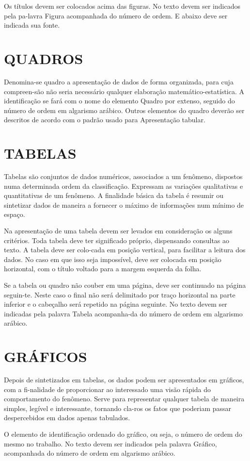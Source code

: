 Os títulos devem ser colocados acima das figuras. No texto devem
ser indicados pela pa-lavra Figura acompanhada do número de ordem. E abaixo deve ser indicada sua fonte.

\section{QUADROS}

Denomina-se quadro a apresentação de dados de forma organizada, para cuja compreen-são não seria necessário qualquer elaboração matemático-estatística. A identificação se fará com o nome do elemento Quadro por extenso, seguido do número de ordem em algarismo arábico. Outros elementos do quadro deverão ser descritos de acordo com o padrão usado para
Apresentação tabular.



\section{TABELAS}

Tabelas são conjuntos de dados numéricos, associados a um
fenômeno, dispostos numa determinada ordem da classificação. Expressam as variações qualitativas e quantitativas de um fenômeno. A finalidade básica da tabela é resumir ou sintetizar dados de maneira a fornecer o máximo de informações num mínimo de espaço.

Na apresentação de uma tabela devem ser levados em consideração
os alguns critérios. Toda tabela deve ter significado próprio, dispensando consultas ao texto. A tabela deve ser colo-cada em posição vertical, para facilitar a leitura dos dados. No caso em que isso seja impossível, deve ser colocada em posição horizontal, com o título voltado para a margem esquerda da folha.

Se a tabela ou quadro não couber em uma página, deve ser
continuado na página seguin-te. Neste caso o final não será delimitado por traço horizontal na parte inferior e o cabeçalho será repetido na página seguinte. No texto devem ser indicadas pela palavra Tabela acompanha-da do número de ordem em algarismo arábico.



\section{GRÁFICOS}

Depois de sintetizados em tabelas, os dados podem ser
apresentados em gráficos, com a fi-nalidade de proporcionar ao interessado uma visão rápida do comportamento do fenômeno. Serve para representar qualquer tabela de maneira simples, legível e interessante, tornando cla-ros os fatos que poderiam passar despercebidos em dados apenas tabulados.

O elemento de identificação ordenado do gráfico, ou seja, o
número de ordem do mesmo no trabalho. No texto devem ser indicados pela palavra Gráfico, acompanhada do número de ordem em algarismo arábico.
